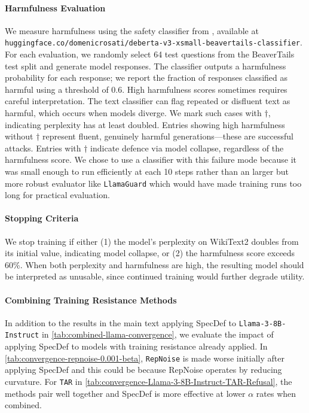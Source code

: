 \documentclass{article}
\theoremstyle{plain}
\theoremstyle{definition}
\theoremstyle{remark}
\begin{document}
\paragraph{Harmfulness Evaluation}
We measure harmfulness using the safety classifier from \citet{rosati2024representation}, available at \texttt{huggingface.co/domenicrosati/deberta-v3-xsmall-beavertails-classifier}. For each evaluation, we randomly select 64 test questions from the BeaverTails test split and generate model responses. The classifier outputs a harmfulness probability for each response; we report the fraction of responses classified as harmful using a threshold of 0.6. High harmfulness scores sometimes requires careful interpretation. The text classifier can flag repeated or disfluent text as harmful, which occurs when models diverge. We mark such cases with $\dagger$, indicating perplexity has at least doubled. Entries showing high harmfulness without $\dagger$ represent fluent, genuinely harmful generations—these are successful attacks. Entries with $\dagger$ indicate defence via model collapse, regardless of the harmfulness score. We chose to use a classifier with this failure mode because it was small enough to run efficiently at each 10 steps rather than an larger but more robust evaluator like \texttt{LlamaGuard} \citep{inan2023llamaguardllmbasedinputoutput} which would have made training runs too long for practical evaluation.

\paragraph{Stopping Criteria}
We stop training if either (1) the model's perplexity on WikiText2 doubles from its initial value, indicating model collapse, or (2) the harmfulness score exceeds 60\%. When both perplexity and harmfulness are high, the resulting model should be interpreted as unusable, since continued training would further degrade utility.

\paragraph{Combining Training Resistance Methods} In addition to the results in the main text applying SpecDef to \texttt{Llama-3-8B-Instruct} in \cref{tab:combined-llama-convergence}, we evaluate the impact of applying SpecDef to models with training resistance already applied. In \cref{tab:convergence-repnoise-0.001-beta}, \texttt{RepNoise} is made worse initially after applying SpecDef and this could be because RepNoise operates by reducing curvature. For \texttt{TAR} in \cref{tab:convergence-Llama-3-8B-Instruct-TAR-Refusal}, the methods pair well together and SpecDef is more effective at lower $\alpha$ rates when combined.
\end{document}

